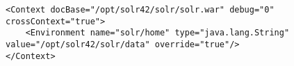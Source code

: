 \begin{lstlisting}[style=xml]
<Context docBase="/opt/solr42/solr/solr.war" debug="0" crossContext="true">
	<Environment name="solr/home" type="java.lang.String" value="/opt/solr42/solr/data" override="true"/>
</Context>	
\end{lstlisting}
